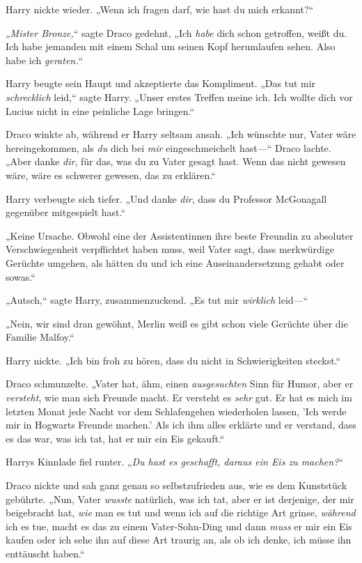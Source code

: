 {Harry nickte wieder. „Wenn ich fragen darf, wie hast du mich erkannt?“

„\emph{Mister Bronze,}“ sagte Draco gedehnt, „Ich \emph{habe} dich schon getroffen, weißt du. Ich habe jemanden mit einem Schal um seinen Kopf herumlaufen sehen. Also habe ich \emph{geraten.}“

Harry beugte sein Haupt und akzeptierte das Kompliment. „Das tut mir \emph{schrecklich} leid,“ sagte Harry. „Unser erstes Treffen meine ich. Ich wollte dich vor Lucius nicht in eine peinliche Lage bringen.“

Draco winkte ab, während er Harry seltsam ansah. „Ich wünschte nur, Vater wäre hereingekommen, als \emph{du} dich bei \emph{mir} eingeschmeichelt hast—“ Draco lachte. „Aber danke \emph{dir}, für das, was du zu Vater gesagt hast. Wenn das nicht gewesen wäre, wäre es schwerer gewesen, das zu erklären.“

Harry verbeugte sich tiefer. „Und danke \emph{dir}, dass du Professor McGonagall gegenüber mitgespielt hast.“

„Keine Ursache. Obwohl eine der Assistentinnen ihre beste Freundin zu absoluter Verschwiegenheit verpflichtet haben muss, weil Vater sagt, dass merkwürdige Gerüchte umgehen, als hätten du und ich eine Auseinandersetzung gehabt oder sowas.“

„Autsch,“ sagte Harry, zusammenzuckend. „Es tut mir \emph{wirklich} leid—“

„Nein, wir sind dran gewöhnt, Merlin weiß es gibt schon viele Gerüchte über die Familie Malfoy.“

Harry nickte. „Ich bin froh zu hören, dass du nicht in Schwierigkeiten steckst.“

Draco schmunzelte. „Vater hat, ähm, einen \emph{ausgesuchten} Sinn für Humor, aber er \emph{versteht}, wie man sich Freunde macht. Er versteht es \emph{sehr} gut. Er hat es mich im letzten Monat jede Nacht vor dem Schlafengehen wiederholen lassen, 'Ich werde mir in Hogwarts Freunde machen.' Als ich ihm alles erklärte und er verstand, dass es das war, was ich tat, hat er mir ein Eis gekauft.“

Harrys Kinnlade fiel runter. „\emph{Du hast es geschafft, daraus ein Eis zu machen?}“

Draco nickte und sah ganz genau so selbstzufrieden aus, wie es dem Kunststück gebührte. „Nun, Vater \emph{wusste} natürlich, was ich tat, aber er ist derjenige, der mir beigebracht hat, \emph{wie} man es tut und wenn ich auf die richtige Art grinse, \emph{während} ich es tue, macht es das zu einem Vater-Sohn-Ding und dann \emph{muss} er mir ein Eis kaufen oder ich sehe ihn auf diese Art traurig an, als ob ich denke, ich müsse ihn enttäuscht haben.“

}
